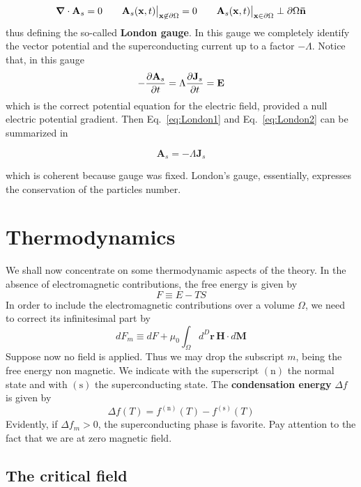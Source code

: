 \begin{equation}\label{eq:LondonGauge}
    \grad\cdot\mathbf{A}_s = 0
    \qquad
    \mathbf{A}_s(\mathbf{x},t) \big|_{\mathbf{x}\not\in\partial\Omega} = 0
    \qquad
    \mathbf{A}_s(\mathbf{x},t) \big|_{\mathbf{x}\in\partial\Omega} \perp \partial\Omega \mathbf{\bar{n}}
\end{equation}
thus defining the so-called \textbf{London gauge}. In this gauge we completely identify the vector potential and the superconducting current up to a factor $-\Lambda$. Notice that, in this gauge
\[
    - \pdv{\mathbf{A}_s}{t} = \Lambda \pdv{\mathbf{J}_s}{t} = \mathbf{E}
\]
which is the correct potential equation for the electric field, provided a null electric potential gradient. Then Eq.~\eqref{eq:London1} and Eq.~\eqref{eq:London2} can be summarized in
\begin{eqbox}
	\begin{equation}\label{eq:LondonPotential}
		\mathbf{A}_s = - \Lambda \mathbf{J}_s
	\end{equation}
\end{eqbox}
which is coherent because gauge was fixed. London's gauge, essentially, expresses the conservation of the particles number.

\section{Thermodynamics}
We shall now concentrate on some thermodynamic aspects of the theory. In the absence of electromagnetic contributions, the free energy is given by
\[
    F \equiv E - TS
\]
In order to include the electromagnetic contributions over a volume $\Omega$, we need to correct its infinitesimal part by
\[
    dF_m \equiv dF + \mu_0 \int_{\Omega} d^D \mathbf{r} \, \mathbf{H} \cdot d\mathbf{M}
\]
Suppose now no field is applied. Thus we may drop the subscript $m$, being the free energy non magnetic. We indicate with the superscript $(\mathrm{n})$ the normal state and with $(\mathrm{s})$ the superconducting state. The \textbf{condensation energy} $\Delta f$ is given by
\[
    \Delta f (T) = f^{(\mathrm{n})}(T) - f^{(\mathrm{s})}(T)
\]
Evidently, if $\Delta f_m > 0$, the superconducting phase is favorite. Pay attention to the fact that we are at zero magnetic field.

\subsection{The critical field}\label{sec:the critical field}

